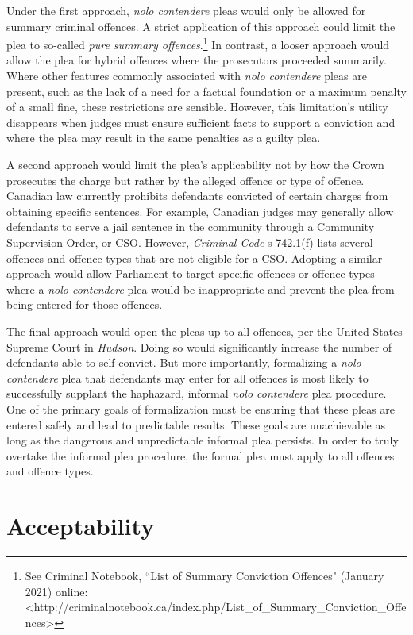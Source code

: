 Under the first approach, \textit{nolo contendere} pleas would only be allowed for summary criminal offences. A strict application of this approach could limit the plea to so-called \textit{pure summary offences}.\footnote{See Criminal Notebook, ``List of Summary Conviction Offences" (January 2021) online: \textless http://criminalnotebook.ca/index.php/List\_of\_Summary\_Conviction\_Offences\textgreater} In contrast, a looser approach would allow the plea for hybrid offences where the prosecutors proceeded summarily. Where other features commonly associated with \textit{nolo contendere} pleas are present, such as the lack of a need for a factual foundation or a maximum penalty of a small fine, these restrictions are sensible. However, this limitation's utility disappears when judges must ensure sufficient facts to support a conviction and where the plea may result in the same penalties as a guilty plea. 

A second approach would limit the plea's applicability not by how the Crown prosecutes the charge but rather by the alleged offence or type of offence. Canadian law currently prohibits defendants convicted of certain charges from obtaining specific sentences. For example, Canadian judges may generally allow defendants to serve a jail sentence in the community through a Community Supervision Order, or CSO. However, \textit{Criminal Code} s 742.1(f) lists several offences and offence types that are not eligible for a CSO. Adopting a similar approach would allow Parliament to target specific offences or offence types where a \textit{nolo contendere} plea would be inappropriate and prevent the plea from being entered for those offences.

The final approach would open the pleas up to all offences, per the United States Supreme Court in \textit{Hudson}. Doing so would significantly increase the number of defendants able to self-convict. But more importantly, formalizing a \textit{nolo contendere} plea that defendants may enter for all offences is most likely to successfully supplant the haphazard, informal \textit{nolo contendere} plea procedure. One of the primary goals of formalization must be ensuring that these pleas are entered safely and lead to predictable results. These goals are unachievable as long as the dangerous and unpredictable informal plea persists. In order to truly overtake the informal plea procedure, the formal plea must apply to all offences and offence types.

\section{Acceptability}

